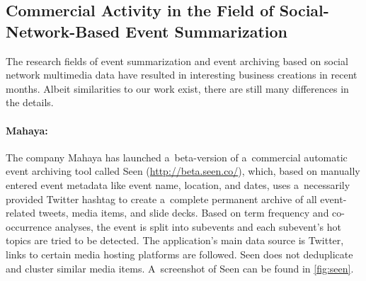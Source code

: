 \subsection{Commercial Activity in the Field of Social-Network-Based Event Summarization}

The research fields of event summarization and event archiving
based on social network multimedia data have resulted in 
interesting business creations in recent months.
Albeit similarities to our work exist,
there are still many differences in the details.

\paragraph{Mahaya:}
 
The company Mahaya has launched a~beta-version
of a~commercial automatic event archiving tool called Seen
(\url{http://beta.seen.co/}),
which, based on manually entered event metadata like event name,
location, and dates, uses a~necessarily provided Twitter hashtag
to create a~complete permanent archive of all event-related tweets,
media items, and slide decks.
Based on term frequency and co-occurrence analyses,
the event is split into subevents
and each subevent's hot topics are tried to be detected.
The application's main data source is Twitter,
links to certain media hosting platforms are followed.
Seen does not deduplicate and cluster
similar media items.
A~screenshot of Seen can be found in \autoref{fig:seen}.

